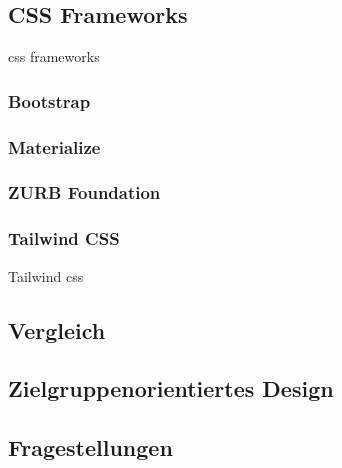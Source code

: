 	
	\cite{jump-start-sass}
	\subsection{CSS Frameworks}
	
	\Gls{css} \Gls{framework}s
		\subsubsection{Bootstrap}
		\subsubsection{Materialize}
		\subsubsection{ZURB Foundation}
		\subsubsection{Tailwind CSS}
		Tailwind \Gls{css}
	
	\subsection{Vergleich}
	
	\subsection{Zielgruppenorientiertes Design}
	\subsection{Fragestellungen}
